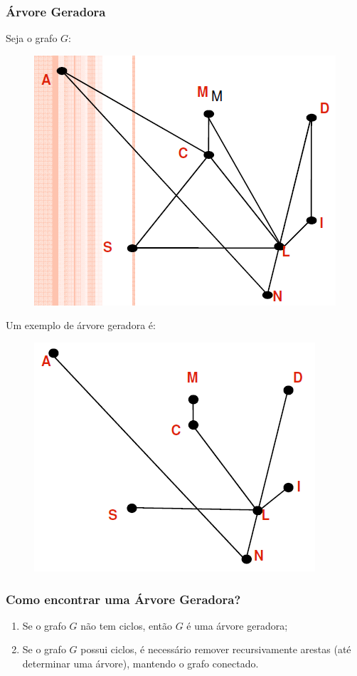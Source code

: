 \documentclass[hyperref={pdfpagelabels=false}]{beamer}
\begin{document}
\begin{frame}
\frametitle{Árvore Geradora}

Seja o grafo $G$:

\begin{figure}[!h]
	\centering
	\includegraphics[scale=0.3]{04}
	\label{04}
\end{figure}

Um exemplo de árvore geradora é:

\begin{figure}[!h]
	\centering
	\includegraphics[scale=0.3]{05}
	\label{05}
\end{figure}


\end{frame}

\begin{frame}
\frametitle{Como encontrar uma Árvore Geradora?}

\begin{enumerate}
	\item Se o grafo $G$ não tem ciclos, então $G$ é uma árvore geradora;
	\item Se o grafo $G$ possui ciclos, é necessário remover recursivamente arestas (até determinar uma árvore), mantendo o grafo conectado.
\end{enumerate}

\end{frame}
\end{document}
